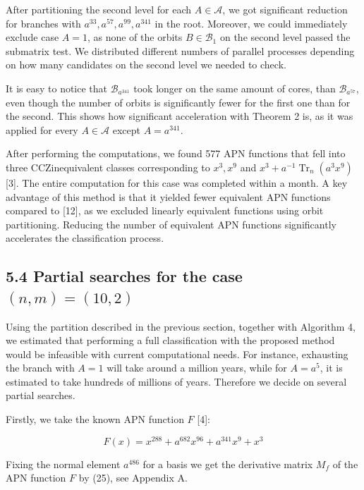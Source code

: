 \documentclass[10pt]{article}
\begin{document}
After partitioning the second level for each $A \in \mathcal{A}$, we got significant reduction for branches with $a^{33}, a^{57}, a^{99}, a^{341}$ in the root. Moreover, we could immediately exclude case $A=1$, as none of the orbits $B \in \mathcal{B}_{1}$ on the second level passed the submatrix test. We distributed different numbers of parallel processes depending on how many candidates on the second level we needed to check.

It is easy to notice that $\mathcal{B}_{a^{341}}$ took longer on the same amount of cores, than $\mathcal{B}_{a^{57}}$, even though the number of orbits is significantly fewer for the first one than for the second. This shows how significant acceleration with Theorem 2 is, as it was applied for every $A \in \mathcal{A}$ except $A=a^{341}$.

After performing the computations, we found 577 APN functions that fell into three CCZinequivalent classes corresponding to $x^{3}, x^{9}$ and $x^{3}+a^{-1} \operatorname{Tr}_{n}\left(a^{3} x^{9}\right)$ [3]. The entire computation for this case was completed within a month. A key advantage of this method is that it yielded fewer equivalent APN functions compared to [12], as we excluded linearly equivalent functions using orbit partitioning. Reducing the number of equivalent APN functions significantly accelerates the classification process.

\subsection*{5.4 Partial searches for the case $(n, m)=(10,2)$}
Using the partition described in the previous section, together with Algorithm 4, we estimated that performing a full classification with the proposed method would be infeasible with current computational needs. For instance, exhausting the branch with $A=1$ will take around a million years, while for $A=a^{5}$, it is estimated to take hundreds of millions of years. Therefore we decide on several partial searches.

Firstly, we take the known APN function $F$ [4]:


\begin{equation*}
F(x)=x^{288}+a^{682} x^{96}+a^{341} x^{9}+x^{3} \tag{18}
\end{equation*}


Fixing the normal element $a^{486}$ for a basis we get the derivative matrix $M_{f}$ of the APN function $F$ by (25), see Appendix A.
\end{document}
